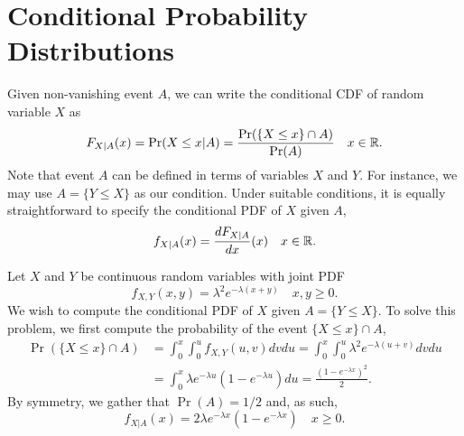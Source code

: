 \section{Conditional Probability Distributions}

Given non-vanishing event $A$, we can write the conditional CDF of random variable $X$ as
\begin{equation*}
F_{X|A} (x) = \Pr (X \leq x | A)
= \frac{ \Pr ( \{ X \leq x \} \cap A ) }{\Pr(A)} \quad x \in \mathbb{R} .
\end{equation*}
Note that event $A$ can be defined in terms of variables $X$ and $Y$.
For instance, we may use $A = \{ Y \leq X \}$ as our condition.
Under suitable conditions, it is equally straightforward to specify the conditional PDF of $X$ given $A$,
\begin{equation*}
f_{X|A} (x) = \frac{d F_{X|A}}{dx} (x) \quad x \in \mathbb{R} .
\end{equation*}

\begin{example}
Let $X$ and $Y$ be continuous random variables with joint PDF
\begin{equation*}
f_{X,Y} (x,y) = \lambda^2 e^{-\lambda (x + y)} \quad x,y \geq 0 .
\end{equation*}
We wish to compute the conditional PDF of $X$ given $A = \{ Y \leq X \}$.
To solve this problem, we first compute the probability of the event $\{ X \leq x \} \cap A$,
\begin{equation*}
\begin{split}
\Pr ( \{ X \leq x \} \cap A )
&= \int_0^x \int_0^{u} f_{X,Y} (u, v) dv du
= \int_0^x \int_0^{u} \lambda^2 e^{-\lambda (u + v)} dv du \\
&= \int_0^x \lambda e^{- \lambda u} \left( 1 - e^{- \lambda u} \right) du
= \frac{ \left( 1 - e^{-\lambda x} \right)^2 }{2} .
\end{split}
\end{equation*}
By symmetry, we gather that $\Pr(A) = 1/2$ and, as such,
\begin{equation*}
f_{X | A} (x) = 2 \lambda e^{-\lambda x} \left( 1 - e^{-\lambda x} \right)
\quad x \geq 0 .
\end{equation*}
\end{example}

